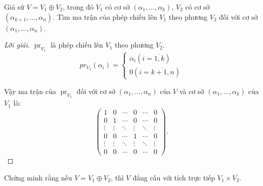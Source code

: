 \begin{exercise}
    Giả sử $V = V_{1}\oplus V_{2}$, trong đó $V_{1}$ có cơ sở $(\alpha_{1}, \ldots, \alpha_{k})$, $V_{2}$ có cơ sở $(\alpha_{k+1}, \ldots, \alpha_{n})$. Tìm ma trận của phép chiếu lên $V_{1}$ theo phương $V_{2}$ đối với cơ sở $(\alpha_{1}, \ldots, \alpha_{n})$.
\end{exercise}

\begin{proof}[Lời giải]
    $\operatorname{pr}_{V_{1}}$ là phép chiếu lên $V_{1}$ theo phương $V_{2}$.
    \[
        pr_{V_{1}}(\alpha_{i}) =
        \begin{cases}
            \alpha_{i} (i = \overline{1, k}) \\
            0 (i = \overline{k+1,n})
        \end{cases}
    \]
    
    Vậy ma trận của $\operatorname{pr}_{V_{1}}$ đối với cơ sở $(\alpha_{1}, \ldots, \alpha_{n})$ của $V$ và cơ sở $(\alpha_{1}, \ldots, \alpha_{k})$ của $V_{1}$ là:
    \[
        \begin{pmatrix}
            1      & 0      & \cdots & 0      & \cdots & 0      \\
            0      & 1      & \cdots & 0      & \cdots & 0      \\
            \vdots & \vdots & \ddots & \vdots & \ddots & \vdots \\
            0      & 0      & \cdots & 1      & \cdots & 0      \\
            \vdots & \vdots & \ddots & \vdots & \ddots & \vdots \\
            0      & 0      & \cdots & 0      & \cdots & 0
        \end{pmatrix}.
    \]
\end{proof}

\begin{exercise}
    Chứng minh rằng nếu $V = V_{1}\oplus V_{2}$, thì $V$ đẳng cấu với tích trực tiếp $V_{1}\times V_{2}$.
\end{exercise}

